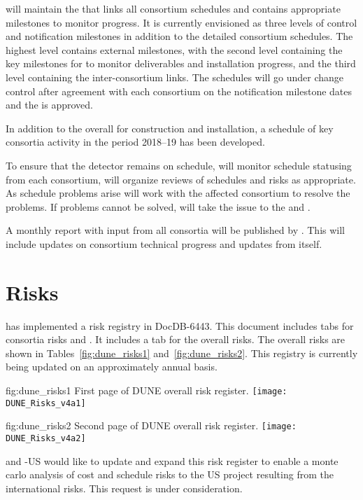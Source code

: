  will maintain the  that links all consortium schedules
and contains appropriate milestones to monitor progress.
It is currently envisioned as
three levels of control and notification milestones in addition to the
detailed consortium schedules. The highest level contains external
milestones, with the second level containing the key milestones for 
to monitor deliverables and installation progress, and the third level
containing the inter-consortium links. The schedules will go
under change control after agreement with each consortium on the
notification milestone dates and the  is approved.

In addition to the overall  for construction and
installation, a schedule of key consortia activity in the period
2018--19  has been developed.

To ensure that the  detector remains on schedule,
 will monitor schedule statusing from each consortium, will organize
reviews of schedules and risks as appropriate.  As schedule problems
arise  will work with the affected consortium to resolve the
problems. If problems cannot be solved,  will take the issue to the
 and .

A monthly report with input from all consortia will be published by
. This will include updates on consortium technical progress and
updates from  itself.

\section{Risks}
\label{sec:fdsp-coord-risks}

 has implemented a risk registry in
DocDB-6443. This document includes tabs for consortia risks
and . It includes a tab for the overall
 risks. The overall  risks are shown in
Tables~\ref{fig:dune_risks1} and~\ref{fig:dune_risks2}. This registry
is currently being updated on an approximately annual basis.
\begin{dunefigure}{fig:dune_risks1}
  {First page of DUNE overall risk register.}
  \texttt{[image: DUNE\_Risks\_v4a1]}
\end{dunefigure}
\begin{dunefigure}{fig:dune_risks2}
  {Second page of DUNE overall risk register.}
  \texttt{[image: DUNE\_Risks\_v4a2]}
\end{dunefigure}
 and -US would like  to update and
expand this risk register to enable a monte carlo analysis of cost and
schedule risks to the US project resulting from the international
 risks. This request is under consideration.

